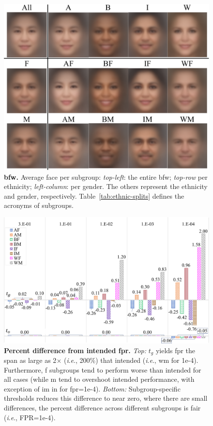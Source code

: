 \documentclass[10pt,twocolumn,letterpaper]{article}
\newcommand{\ie}{\textit{i}.\textit{e}., }
\begin{document}
\begin{figure}[t!]
    \centering
    \includegraphics[width=.8\linewidth]{figures/montage.pdf}
    \caption{\small{\textbf{\gls{bfw}.} Average face per subgroup: \emph{top-left}: the entire \gls{bfw}; \emph{top-row} per ethnicity;  \emph{left-column}: per gender. The others represent the ethnicity and gender, respectively. Table~\ref{tab:ethnic-splits} defines the acronyms of subgroups.}}
    \label{fig:avg-faces}
\end{figure}






\begin{figure}[t!]
       \centering
    \includegraphics[width=.95\linewidth]{figures/fpr_percent_diff-crop.pdf}
    \caption{\small{\textbf{Percent difference from intended \gls{fpr}.} \emph{Top:} $t_g$ yields \gls{fpr} the span as large as 2$\times$ (\ie 200\%) that intended (\ie \gls{wm} for 1e-4). Furthermore, \gls{f} subgroups tend to perform worse than intended for all cases (while \gls{m} tend to overshoot intended performance, with exception of \gls{im} in for \gls{fpr}=1e-4). \emph{Bottom:} Subgroup-specific thresholds reduces this difference to near zero, where there are small differences, the percent difference across different subgroups is fair (\ie FPR=1e-4).}}\label{fig:percent:difference}
    \vspace{-4mm}
\end{figure}
\end{document}
